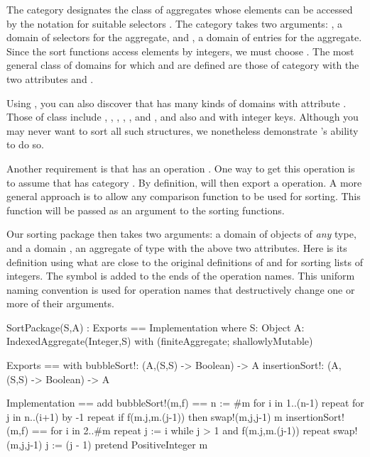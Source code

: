 The category  designates the class of
aggregates whose elements can be accessed by the notation
 for suitable selectors .
The category  takes two arguments:
, a domain of selectors for the aggregate, and
, a domain of entries for the aggregate.
Since the sort functions access elements by integers, we must
choose .
The most general class of domains for which  and
 are defined are those of
category  with the two
attributes  and
.

Using \Browse{}, you can also discover that \Language{} has many kinds of domains
with attribute .
Those of class  include
, , ,
, , and , and also
 and  with integer keys.
Although you may never want to sort all such structures, we
nonetheless demonstrate \Language{}'s
ability to do so.

Another requirement is that  has an
operation \spadop{<}.
One way to get this operation is to assume that
 has category .
By definition, will then export a \spadop{<} operation.
A more general approach is to allow any comparison function
 to be used for sorting.
This function will be passed as an argument to the sorting
functions.

Our sorting package then takes two arguments: a domain 
of objects of {\it any} type, and a domain , an aggregate
of type  with the above
two attributes.
Here is its definition using what are close to the original
definitions of  and  for
sorting lists of integers.
The symbol \spadSyntax{!} is added to the ends of the operation
names.
This uniform naming convention is used for \Language{} operation
names that destructively change one or more of their arguments.

\begin{xmpLines}
SortPackage(S,A) : Exports == Implementation where
  S: Object
  A: IndexedAggregate(Integer,S)
    with (finiteAggregate; shallowlyMutable)

  Exports == with
    bubbleSort!: (A,(S,S) -> Boolean) -> A
    insertionSort!: (A, (S,S) -> Boolean) -> A

  Implementation == add
    bubbleSort!(m,f) ==
      n := #m
      for i in 1..(n-1) repeat
        for j in n..(i+1) by -1 repeat
          if f(m.j,m.(j-1)) then swap!(m,j,j-1)
      m
    insertionSort!(m,f) ==
      for i in 2..#m repeat
        j := i
        while j > 1 and f(m.j,m.(j-1)) repeat
          swap!(m,j,j-1)
          j := (j - 1) pretend PositiveInteger
      m
\end{xmpLines}

